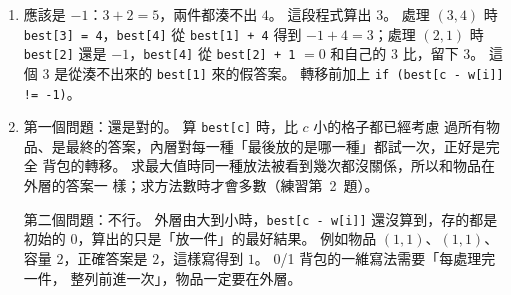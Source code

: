 \begin{enumerate}
\item 應該是 $-1$：$3 + 2 = 5$，兩件都湊不出 $4$。 這段程式算出 $3$。 處理
$(3, 4)$ 時 \texttt{best[3] = 4}，\texttt{best[4]} 從 \texttt{best[1] + 4}
得到 $-1 + 4 = 3$；處理 $(2, 1)$ 時 \texttt{best[2]} 還是 $-1$，\texttt{best[4]} 從
\texttt{best[2] + 1} $= 0$ 和自己的 $3$ 比，留下 $3$。 這個 $3$ 是從湊不出來的 \texttt{best[1]}
來的假答案。 轉移前加上 \texttt{if (best[c - w[i]] != -1)}。

\item 第一個問題：還是對的。 算 \texttt{best[c]} 時，比 $c$ 小的格子都已經考慮
過所有物品、是最終的答案，內層對每一種「最後放的是哪一種」都試一次，正好是完全
背包的轉移。 求最大值時同一種放法被看到幾次都沒關係，所以和物品在外層的答案一
樣；求方法數時才會多數（練習第~2~題）。

第二個問題：不行。 外層由大到小時，\texttt{best[c - w[i]]} 還沒算到，存的都是
初始的 $0$，算出的只是「放一件」的最好結果。 例如物品 $(1, 1)$、$(1, 1)$、容量
$2$，正確答案是 $2$，這樣寫得到 $1$。 0/1 背包的一維寫法需要「每處理完一件，
整列前進一次」，物品一定要在外層。
\end{enumerate}
